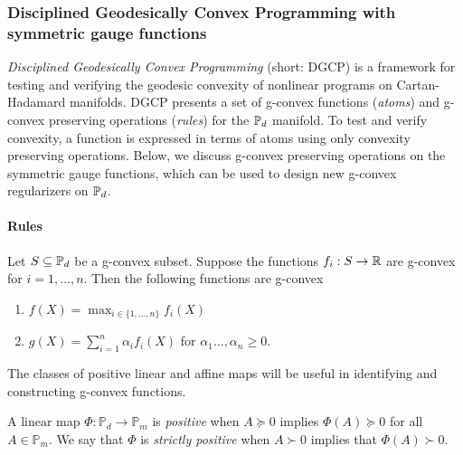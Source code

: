 \documentclass[sn-nature]{sn-jnl}%
\theoremstyle{thmstyleone}%
\theoremstyle{thmstyletwo}%
\theoremstyle{thmstylethree}%
\begin{document}

\subsubsection{Disciplined Geodesically Convex Programming with symmetric gauge functions}

\emph{Disciplined Geodesically Convex Programming} (short: DGCP) \citep{cheng2024disciplinedgeodesicallyconvexprogramming} is a framework for testing and verifying the geodesic convexity of nonlinear programs on Cartan-Hadamard manifolds.
DGCP presents a set of g-convex functions (\emph{atoms})  
and g-convex preserving operations (\emph{rules}) for the $\mathbb{P}_d$ manifold. To test and verify convexity, a function is expressed in terms of atoms using only convexity preserving operations. Below, we discuss g-convex preserving operations on the symmetric gauge functions, which can be used to design new g-convex regularizers on $\mathbb{P}_d$.

\paragraph{Rules}
\begin{prop}
    Let $S \subseteq \mathbb{P}_d$ be a g-convex subset. Suppose the functions $f_i: S \to \mathbb{R}$ are g-convex for $i= 1, \ldots, n$. Then the following functions are g-convex

    \begin{enumerate}
        \item $f(X) =  \max_{i \in \{1, \ldots, n\}} f_i(X)$
        \item $g(X) = \sum_{i=1}^n \alpha_i f_i(X)$ for $\alpha_1 \ldots, \alpha_n \geq 0$.
    \end{enumerate}
\end{prop}


The classes of positive linear and affine maps will be useful in identifying and constructing g-convex functions.

\begin{definition}
    A linear map $\Phi:\mathbb{P}_d \to \mathbb{P}_m$ is \textit{positive} when $A \succeq 0$ implies $\Phi(A) \succeq 0$ for all $A \in \mathbb{P}_m$. We say that $\Phi$ is \textit{strictly positive} when $A \succ 0$ implies that $\Phi(A) \succ 0$.
\end{definition}
%
\end{document}
